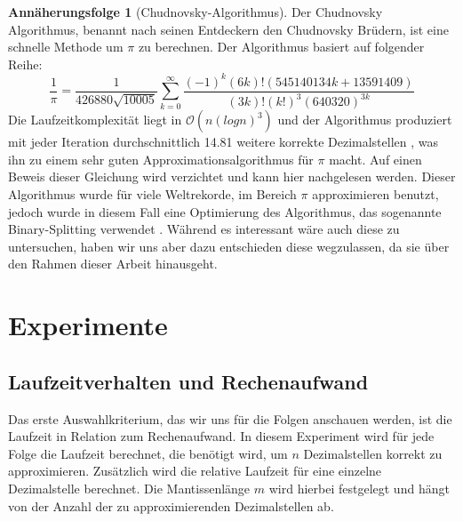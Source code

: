 \documentclass{scrartcl}
\theoremstyle{definition}
\newtheorem{approximation sequence}{Annäherungsfolge}
\begin{document}
\begin{approximation sequence}[Chudnovsky-Algorithmus]
Der Chudnovsky Algorithmus, benannt nach seinen Entdeckern den Chudnovsky
Brüdern, ist eine schnelle Methode um \(\pi\) zu berechnen. Der Algorithmus
basiert auf folgender Reihe\cite{Chudnovsky}:
\begin{equation*}
    \frac{1}{\pi}
    = \frac{1}{426880 \sqrt{10005}}
    \sum_{k = 0}^{\infty}
    \frac{(-1)^k(6k)!(545140134k+13591409)}{(3k)!(k!)^3(640320)^{3k}}
\end{equation*}
Die Laufzeitkomplexität liegt in \(\mathcal{O}(n(logn)^3)\)
\cite{Runtime-Chudnovsky} und der Algorithmus produziert mit jeder Iteration
durchschnittlich 14.81 weitere korrekte Dezimalstellen
\cite{Nachkommastellen-Chudnovsky}, was ihn zu einem sehr guten
Approximationsalgorithmus für \(\pi\) macht. Auf einen Beweis dieser Gleichung
wird verzichtet und kann hier \cite{Chudnovsky-Proof} nachgelesen werden.
Dieser Algorithmus wurde für viele Weltrekorde, im Bereich \(\pi\)
approximieren benutzt, jedoch wurde in diesem Fall eine Optimierung des
Algorithmus, das sogenannte Binary-Splitting verwendet \cite{Chudnovsky}.
Während es interessant wäre auch diese zu untersuchen, haben wir uns aber dazu
entschieden diese wegzulassen, da sie über den Rahmen dieser Arbeit hinausgeht.

\end{approximation sequence}

\pagebreak

\section{Experimente}

\subsection{Laufzeitverhalten und Rechenaufwand}

Das erste Auswahlkriterium, das wir uns für die Folgen anschauen werden, ist
die Laufzeit in Relation zum Rechenaufwand. In diesem Experiment wird für jede
Folge die Laufzeit berechnet, die benötigt wird, um \(n\) Dezimalstellen
korrekt zu approximieren. Zusätzlich wird die relative Laufzeit für eine
einzelne Dezimalstelle berechnet. Die Mantissenlänge \(m\) wird hierbei
festgelegt und hängt von der Anzahl der zu approximierenden Dezimalstellen ab.
\end{document}
